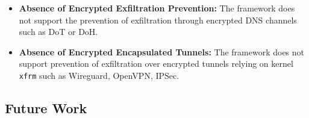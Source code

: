 \documentclass [11pt, proquest] {uwthesis}[2020/02/24]
\begin{document}
\begin{itemize}[nosep]
  \item \textbf{Absence of Encrypted Exfiltration Prevention:} The framework does not support the prevention of exfiltration through encrypted DNS channels such as DoT or DoH.

  \item \textbf{Absence of Encrypted Encapsulated Tunnels:} The framework does not support prevention of exfiltration over encrypted tunnels relying on kernel \texttt{xfrm} such as Wireguard, OpenVPN, IPSec. 

\end{itemize}

\subsection*{Future Work}
\end{document}
